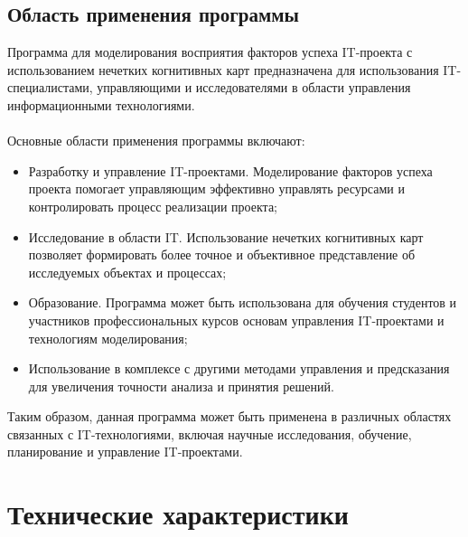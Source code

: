 \documentclass{article}
\begin{document}
    \subsection {Область применения программы}
    Программа для моделирования восприятия факторов успеха IT-проекта с использованием нечетких когнитивных карт предназначена для использования IT-специалистами, управляющими и исследователями в области управления информационными технологиями.\\
    ~\\
    Основные области применения программы включают:
    \begin{itemize}
        \item Разработку и управление IT-проектами. Моделирование факторов успеха проекта помогает управляющим эффективно управлять ресурсами и контролировать процесс реализации проекта;
        \item Исследование в области IT. Использование нечетких когнитивных карт позволяет формировать более точное и объективное представление об исследуемых объектах и процессах;
        \item Образование. Программа может быть использована для обучения студентов и участников профессиональных курсов основам управления IT-проектами и технологиям моделирования;
        \item Использование в комплексе с другими методами управления и предсказания для увеличения точности анализа и принятия решений.
    \end{itemize}
    Таким образом, данная программа может быть применена в различных областях связанных с IT-технологиями, включая научные исследования, обучение, планирование и управление IT-проектами.

    \newpage
    \section {Технические характеристики}
\end{document}
